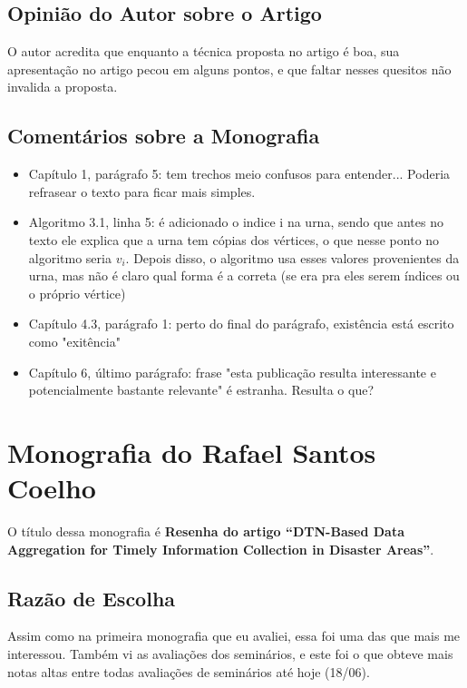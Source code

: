\documentclass[a4paper,11pt]{article}
\begin{document}
\subsection{Opinião do Autor sobre o Artigo}
O autor acredita que enquanto a técnica proposta no artigo é boa, sua apresentação no artigo pecou 
em alguns pontos, e que faltar nesses quesitos não invalida a proposta. 

\subsection{Comentários sobre a Monografia}
\begin{itemize}
  \item Capítulo 1, parágrafo 5: tem trechos meio confusos para entender... Poderia refrasear o texto 
para ficar mais simples.

  \item Algoritmo 3.1, linha 5: é adicionado o indice i na urna, sendo que antes no texto ele explica
que a urna tem cópias dos vértices, o que nesse ponto no algoritmo seria $v_{i}$.
Depois disso, o algoritmo usa esses valores provenientes da urna, mas não é claro
qual forma é a correta (se era pra eles serem índices ou o próprio vértice)

  \item Capítulo 4.3, parágrafo 1: perto do final do parágrafo, existência está escrito como "exitência"

  \item Capítulo 6, último parágrafo: frase "esta publicação resulta interessante e potencialmente
bastante relevante" é estranha. Resulta o que?
\end{itemize}


\pagebreak

\section{Monografia do Rafael Santos Coelho}
O título dessa monografia é \textbf{Resenha do artigo \textquotedblleft DTN-Based 
Data Aggregation for Timely Information Collection in Disaster Areas\textquotedblright }.

\subsection{Razão de Escolha}
Assim como na primeira monografia que eu avaliei, essa foi uma das que mais me interessou.
Também vi as avaliações dos seminários, e este foi o que obteve mais notas altas entre todas avaliações
de seminários até hoje (18/06).
\end{document}
